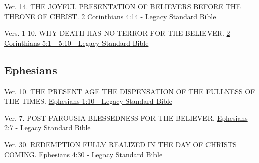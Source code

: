 \documentclass[
  ignorenonframetext,
]{beamer}
\begin{document}
\begin{frame}{4}
\label{section-206}
\begin{block}{Ver. 14. THE JOYFUL PRESENTATION OF BELIEVERS BEFORE THE
THRONE OF CHRIST.}
\label{ver.-14.-the-joyful-presentation-of-believers-before-the-throne-of-christ.}
\href{https://read.lsbible.org/?q=2cor4\%3A14}{2 Corinthians 4:14 -
Legacy Standard Bible}
\end{block}
\end{frame}

\begin{frame}{5}
\label{section-207}
\begin{block}{Vers. 1-10. WHY DEATH HAS NO TERROR FOR THE BELIEVER.}
\label{vers.-1-10.-why-death-has-no-terror-for-the-believer.}
\href{https://read.lsbible.org/?q=2cor5\%3A1-10}{2 Corinthians 5:1 -
5:10 - Legacy Standard Bible}
\end{block}
\end{frame}

\subsection{Ephesians}\label{ephesians}

\begin{frame}{1}
\label{section-208}
\begin{block}{Ver. 10. THE PRESENT AGE THE DISPENSATION OF THE FULLNESS
OF THE TIMES.}
\label{ver.-10.-the-present-age-the-dispensation-of-the-fullness-of-the-times.}
\href{https://read.lsbible.org/?q=eph1\%3A10}{Ephesians 1:10 - Legacy
Standard Bible}
\end{block}
\end{frame}

\begin{frame}{2}
\label{section-209}
\begin{block}{Ver. 7. POST-PAROUSIA BLESSEDNESS FOR THE BELIEVER.}
\label{ver.-7.-post-parousia-blessedness-for-the-believer.}
\href{https://read.lsbible.org/?q=eph2\%3A7}{Ephesians 2:7 - Legacy
Standard Bible}
\end{block}
\end{frame}

\begin{frame}{4}
\label{section-210}
\begin{block}{Ver. 30. REDEMPTION FULLY REALIZED IN THE DAY OF
CHRIST\textquotesingle S COMING.}
\label{ver.-30.-redemption-fully-realized-in-the-day-of-christs-coming.}
\href{https://read.lsbible.org/?q=eph4\%3A30}{Ephesians 4:30 - Legacy
Standard Bible}
\end{block}
\end{frame}
\end{document}
